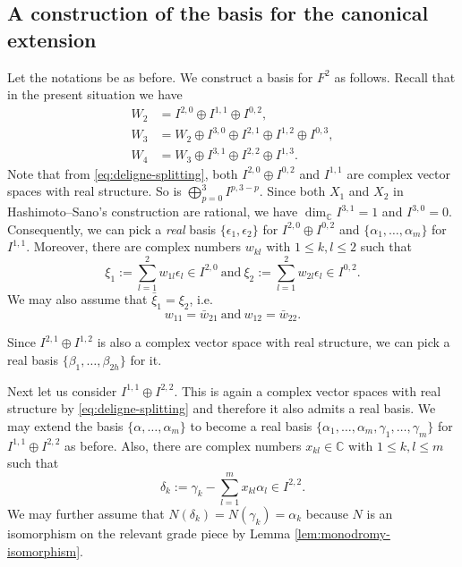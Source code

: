 \subsection{A construction of the basis for the canonical extension}
Let the notations be as before. We construct a basis for 
\(F^{2}\) as follows. Recall that in the present situation we have
\begin{align}
W_{2}&=I^{2,0}\oplus I^{1,1}\oplus I^{0,2},\\
W_{3}&=W_{2}\oplus I^{3,0}\oplus I^{2,1}\oplus I^{1,2}\oplus I^{0,3},\\
W_{4}&=W_{3}\oplus I^{3,1}\oplus I^{2,2}\oplus I^{1,3}.
\end{align}
Note that from \eqref{eq:deligne-splitting},
both \(I^{2,0}\oplus I^{0,2}\) and \(I^{1,1}\) are
complex vector spaces with real structure. So is \(\bigoplus_{p=0}^{3} I^{p,3-p}\).
Since both \(X_{1}\) and \(X_{2}\) in Hashimoto--Sano's construction
are rational, we have \(\dim_{\mathbb{C}} I^{3,1}=1\) and \(I^{3,0}=0\).
Consequently, we can pick a \emph{real} basis
\(\{\epsilon_{1},\epsilon_{2}\}\) for \(I^{2,0}\oplus I^{0,2}\) and 
\(\{\alpha_{1},\ldots,\alpha_{m}\}\) 
for \(I^{1,1}\). Moreover, there are complex numbers \(w_{kl}\) with 
\(1\le k,l\le 2\) such that
\begin{equation}
\xi_{1}:=\sum_{l=1}^{2} w_{1l}\epsilon_{l}\in I^{2,0}~
\mbox{and}~\xi_{2}:=\sum_{l=1}^{2} w_{2l}\epsilon_{l}\in I^{0,2}.
\end{equation}
We may also assume that \(\bar{\xi}_{1}=\xi_{2}\), i.e.~
\begin{equation}
w_{11}=\bar{w}_{21}~\mbox{and}~w_{12}=\bar{w}_{22}.
\end{equation}

Since \(I^{2,1}\oplus I^{1,2}\) is also a 
complex vector space with real structure, we can pick 
a real basis \(\{\beta_{1},\ldots,\beta_{2h}\}\) for it.

Next let us consider \(I^{1,1}\oplus I^{2,2}\). 
This is again a complex vector spaces with real structure
by \eqref{eq:deligne-splitting} and therefore it also 
admits a real basis. We may extend the basis \(\{\alpha,\ldots,\alpha_{m}\}\)
to become a real basis 
\(\{\alpha_{1},\ldots,\alpha_{m},\gamma_{1},\ldots,\gamma_{m}\}\) 
for \(I^{1,1}\oplus I^{2,2}\) as before. Also, there are complex numbers
\(x_{kl}\in\mathbb{C}\) with \(1\le k,l\le m\) such that
\begin{equation}
\delta_{k}:=\gamma_{k}-\sum_{l=1}^{m} x_{kl}\alpha_{l}\in I^{2,2}.
\end{equation}
We may further assume that \(N(\delta_{k})=N(\gamma_{k})=\alpha_{k}\) because 
\(N\) is an isomorphism on the relevant grade piece by Lemma 
\ref{lem:monodromy-isomorphism}.

